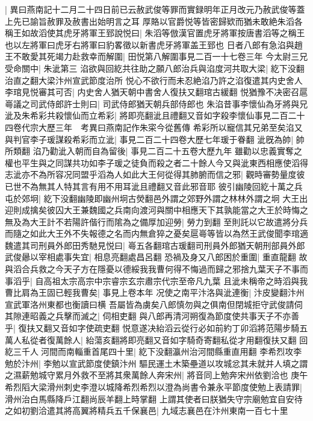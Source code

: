 |{
	異曰燕南記十二月二十四日前已云赦武俊等罪而實録明年正月改元乃赦武俊等蓋上先已諭旨赦罪及赦書出始明言之耳}
厚賂以官爵悦等皆密歸欵而猶未敢絶朱滔各稱王如故滔使其虎牙將軍王郅說悦曰|{
	朱滔等倣漢官置虎牙將軍按唐書滔等之稱王也以左將軍曰虎牙右將軍曰豹畧徵以新書虎牙將軍盖王郅也}
日者八郎有急淊與趙王不敢愛其死竭力赴救幸而解圍|{
	田悦第八解圍事見二百一十七卷三年}
今太尉三兄受命關中|{
	朱泚第三}
淊欲與回紇共往助之願八郎治兵與淊度河共取大梁|{
	紇下没翻治直之翻大梁汴州宣武節度治所}
悦心不欲行而未忍絶淊乃許之淊復遣其内史舍人李琯見悦審其可否|{
	内史舍人猶天朝中書舍人復扶又翻琯古緩翻}
悦猶豫不决密召扈㠋議之司武侍郎許士則曰|{
	司武侍郎猶天朝兵部侍郎也}
朱淊昔事李懷仙為牙將與兄泚及朱希彩共殺懷仙而立希彩|{
	將即亮翻泚且禮翻又音如字殺李懷仙事見二百二十四卷代宗大歷三年　考異曰燕南記作朱寀今從舊傳}
希彩所以寵信其兄弟至矣淊又與判官李子瑗謀殺希彩而立泚|{
	事見二百二十四卷大歷七年瑗于眷翻}
泚旣為帥|{
	帥所類翻}
淊乃勸泚入朝而自為留後|{
	事見二百二十五卷大歷九年}
雖勸以忠義實奪之權也平生與之同謀共功如李子瑗之徒負而殺之者二十餘人今又與泚東西相應使滔得志泚亦不為所容况同盟乎滔為人如此大王何從得其肺腑而信之邪|{
	觀時審勢量度彼已世不為無其人特其言有用不用耳泚且禮翻又音此邪音耶}
彼引幽陵回紇十萬之兵屯於郊坰|{
	紇下没翻幽陵即幽州坰古熒翻邑外謂之郊野外謂之林林外謂之坰}
大王出迎則成擒矣彼囚大王兼魏國之兵南向渡河與關中相應天下其孰能當之大王於時悔之無及為大王計不若陽許偕行而隂為之備厚加迎勞|{
	勞力到翻}
至則託以它故遣將分兵而隨之如此大王外不失報德之名而内無倉猝之憂矣扈㠋等皆以為然王武俊聞李琯適魏遣其司刑員外郎田秀馳見悦曰|{
	㠋五各翻琯古瑗翻司刑員外郎猶天朝刑部員外郎}
武俊曏以宰相處事失宜|{
	相息亮翻處昌呂翻}
恐禍及身又八郎困於重圍|{
	重直龍翻}
故與滔合兵救之今天子方在隱憂以德綏我我曹何得不悔過而歸之邪捨九葉天子不事而事滔乎|{
	自高祖太宗高宗中宗睿宗玄宗肅宗代宗至帝凡九葉}
且泚未稱帝之時滔與我曹比肩為王固已輕我曹矣|{
	事見上卷本年}
况使之南平汴洛與泚連衡|{
	汴皮變翻汴州宣武軍洛州東都也衡讀曰横}
吾屬皆為虜矣八郎慎勿與之俱南但閉城拒守武俊請伺其隙連昭義之兵擊而滅之|{
	伺相吏翻}
與八郎再清河朔復為節度使共事天子不亦善乎|{
	復扶又翻又音如字使疏吏翻}
悦意遂决紿滔云從行必如前約丁卯滔將范陽步騎五萬人私從者復萬餘人|{
	紿蕩亥翻將即亮翻又音如字騎奇寄翻私從才用翻復扶又翻}
回紇三千人河間而南輜重首尾四十里|{
	紇下没翻瀛州治河間縣重直用翻}
李希烈攻李勉於汴州|{
	李勉以宣武節度使鎮汴州}
驅民運土木築壘道以攻城忿其未就并人填之謂之濕薪勉城守累月外救不至將其衆萬餘人奔宋州|{
	將音同上勉奔宋州依劉洽也}
庚午希烈䧟大梁滑州刺史李澄以城降希烈希烈以澄為尚書令兼永平節度使勉上表請罪|{
	滑州治白馬縣降戶江翻尚辰羊翻上時掌翻}
上謂其使者曰朕猶失守宗廟勉宜自安待之如初劉洽遣其將高翼將精兵五千保襄邑|{
	九域志襄邑在汴州東南一百七十里}
